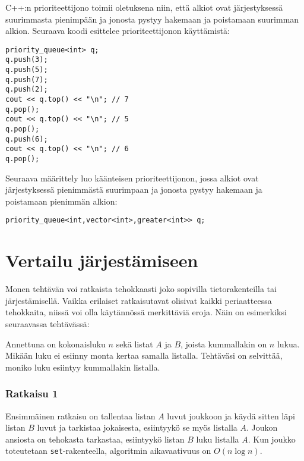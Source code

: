 \begin{samepage}
C++:n prioriteettijono toimii oletuksena niin,
että alkiot ovat järjestyksessä suurimmasta pienimpään
ja jonosta pystyy hakemaan ja poistamaan suurimman alkion.
Seuraava koodi esittelee prioriteettijonon käyttämistä:

\begin{lstlisting}
priority_queue<int> q;
q.push(3);
q.push(5);
q.push(7);
q.push(2);
cout << q.top() << "\n"; // 7
q.pop();
cout << q.top() << "\n"; // 5
q.pop();
q.push(6);
cout << q.top() << "\n"; // 6
q.pop();
\end{lstlisting}
\end{samepage}

Seuraava määrittely luo käänteisen prioriteettijonon,
jossa alkiot ovat järjestyksessä pienimmästä suurimpaan
ja jonosta pystyy hakemaan ja poistamaan pienimmän alkion:

\begin{lstlisting}
priority_queue<int,vector<int>,greater<int>> q;
\end{lstlisting}

\section{Vertailu järjestämiseen}

Monen tehtävän voi ratkaista tehokkaasti joko
sopivilla tietorakenteilla tai järjestämisellä.
Vaikka erilaiset ratkaisutavat olisivat kaikki
periaatteessa tehokkaita, niissä voi olla
käytännössä merkittäviä eroja.
Näin on esimerkiksi seuraavassa tehtävässä:

\begin{task}
Annettuna on kokonaisluku $n$ sekä listat $A$ ja $B$,
joista kummallakin on $n$ lukua.
Mikään luku ei esiinny monta kertaa samalla listalla.
Tehtäväsi on selvittää, moniko luku esiintyy
kummallakin listalla.
\end{task}

\subsubsection{Ratkaisu 1}

Ensimmäinen ratkaisu on tallentaa listan $A$ luvut joukkoon
ja käydä sitten läpi listan $B$ luvut ja
tarkistaa jokaisesta, esiintyykö se myös listalla $A$.
Joukon ansiosta on tehokasta tarkastaa,
esiintyykö listan $B$ luku listalla $A$.
Kun joukko toteutetaan \texttt{set}-rakenteella,
algoritmin aikavaativuus on $O(n \log n)$.

